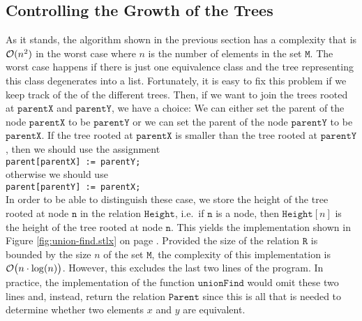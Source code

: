 \subsection{Controlling the Growth of the Trees}
As it stands, the algorithm shown in the previous section has a complexity that is $\mathcal{O}(n^2)$ in the
worst case where $n$ is the number of elements in the set $ \texttt{M}$.  The worst case happens if there
is just one equivalence class and the tree representing this class degenerates into a list.
Fortunately, it is easy to fix this problem if we keep track of the  of the
different trees.  Then, if we want to join the trees rooted at $\texttt{parentX}$ and
$\texttt{parentY}$, we have a choice: We can either set the parent of the node $\texttt{parentX}$ to
be $\texttt{parentY}$ or we can set the parent of the node $\texttt{parentY}$ to be $\texttt{parentX}$.
If the tree rooted at $\texttt{parentX}$ is smaller than the tree rooted at $\texttt{parentY}$, then we should
use the assignment
\\[0.2cm]
\hspace*{1.3cm}
\texttt{parent[parentX] := parentY;}
\\[0.2cm]
otherwise we should use
\\[0.2cm]
\hspace*{1.3cm}
\texttt{parent[parentY] := parentX;}
\\[0.2cm]
In order to be able to distinguish these case, we store the height of the tree rooted at node
$\texttt{n}$ in the relation $\texttt{Height}$, i.e.~if $\texttt{n}$ is a node, then $\texttt{Height}[n]$ is
the height of the tree rooted at node $\texttt{n}$.  This yields the implementation shown in Figure
\ref{fig:union-find.stlx} on page \pageref{fig:union-find.stlx}.  Provided the size  of the relation
$\texttt{R}$ is bounded by the size $n$ of the set $ \texttt{M}$, the complexity of this
implementation is $\mathcal{O}\bigl(n \cdot \log(n)\bigr)$.  However, this excludes the last two lines of
the program.  In practice, the implementation of the function $\texttt{unionFind}$ would omit these
two lines and, instead, return the relation $\texttt{Parent}$ since this is all that is needed to
determine whether two elements $x$ and $y$ are equivalent. 


